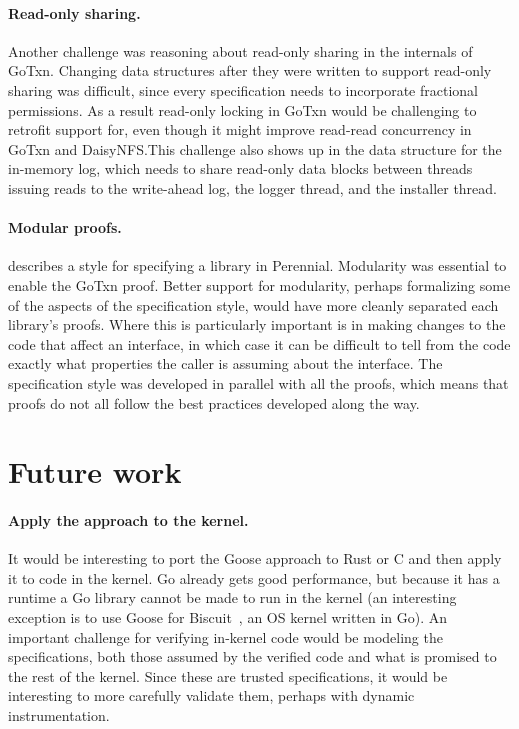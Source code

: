 \paragraph{Read-only sharing.}
Another challenge was reasoning about read-only
sharing in the internals of GoTxn. Changing data structures after they were written to support read-only
sharing was difficult, since every specification needs to incorporate fractional
permissions. As a result read-only locking in GoTxn would be challenging to retrofit support for, even
though it might improve read-read concurrency in GoTxn and DaisyNFS.\@ This challenge
also shows up in the data structure for the in-memory log, which needs to share
read-only data blocks between threads issuing reads to the write-ahead log, the logger
thread, and the installer thread.

\paragraph{Modular proofs.}
 describes a style for specifying a library in Perennial.
Modularity was essential to enable the GoTxn proof. Better support for
modularity, perhaps formalizing some of the aspects of the specification style,
would have more cleanly separated each library's proofs. Where this is
particularly important is in making changes to the code that affect an
interface, in which case it can be difficult to tell from the code exactly what
properties the caller is assuming about the interface. The specification style
was developed in parallel with all the proofs, which means that proofs do not
all follow the best practices developed along the way.

\section{Future work}

\paragraph{Apply the approach to the kernel.} It would be interesting to port
the Goose approach to Rust or C and then apply it to code in the kernel. Go
already gets good performance, but because it has a runtime a Go library cannot
be made to run in the kernel (an interesting exception is to use Goose for
Biscuit~\cite{cutler:biscuit}, an OS kernel written in Go). An important
challenge for verifying in-kernel code would be modeling the specifications,
both those assumed by the verified code and what is promised to the rest of the
kernel. Since these are trusted specifications, it would be interesting to more
carefully validate them, perhaps with dynamic instrumentation.

